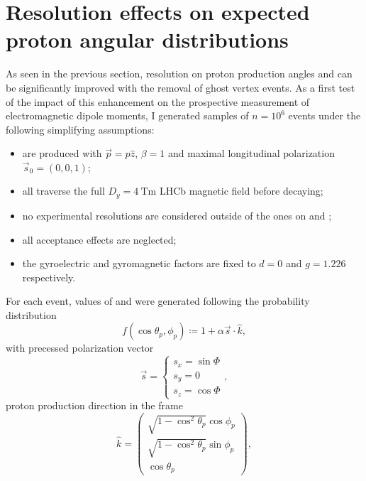 \section{Resolution effects on expected proton angular distributions}
As seen in the previous section, resolution on proton production angles \thetap and \phip can be significantly improved with the removal of ghost vertex events.
As a first test of the impact of this enhancement on the prospective measurement of \lz electromagnetic dipole moments, I generated samples of $n={10}^6$ \demonstratorshort events under the following simplifying assumptions:
\begin{itemize}
	\item \lz are produced with $\vec{p} = p \hat{z}$, $\beta=1$ and maximal longitudinal polarization $\vec{s}_0 = (0, 0, 1)$;
	\item all \lz traverse the full $D_y = \SI{4}{\tesla\meter}$ LHCb magnetic field before decaying;
	\item no experimental resolutions are considered outside of the ones on \cthetap and \phip;
	\item all acceptance effects are neglected;
	\item the \lz gyroelectric and gyromagnetic factors are fixed to $d=0$ and $g=1.226$ \cite{mdm_g_value} respectively.
\end{itemize}
For each event, values of \cthetap and \phip were generated following the probability distribution
\begin{equation}
f(\cos\theta_p, \phi_p) \coloneqq
1 +  \alpha \vec{s} \cdot \hat{k},
\label{eq:5:pdf_costheta_phi}
\end{equation}
with precessed polarization vector
\begin{equation}
\vec{s} =
\begin{cases}
	s_x = \sin\Phi\\
	s_y = 0 \\
	s_z = \cos\Phi
\end{cases},
\label{eq:5:final_polarization}
\end{equation}
proton production direction in the \slambda frame
\begin{equation}
\hat{k}
=
\begin{pmatrix}
	\sqrt{1-\cos^2 \theta_p} \cos \phi_p \\
	\sqrt{1-\cos^2 \theta_p} \sin \phi_p \\
	\cos\theta_p
\end{pmatrix},
\label{eq:5:k_hat}
\end{equation}

